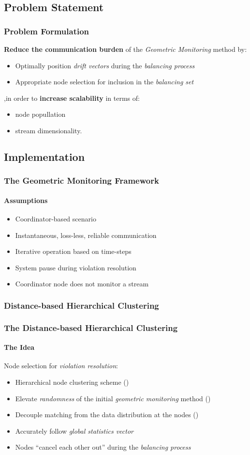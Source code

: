 \documentclass[hyperref={pdfpagelabels=false}]{beamer}
\begin{document}
\subsection{Problem Statement}
\begin{frame} \frametitle{Problem Formulation}
\textbf{Reduce the communication burden} of the \emph{Geometric Monitoring} method by:
\begin{itemize}
\item Optimally position \emph{drift vectors} during the \emph{balancing process}
\item Appropriate node selection for inclusion in the \emph{balancing set}
\end{itemize}
,in order to \textbf{increase scalability} in terms of:
\begin{itemize}
\item node popullation
\item stream dimensionality.
\end{itemize}
\end{frame}
\subsection{Implementation}

\begin{frame} \frametitle{The Geometric Monitoring Framework} \framesubtitle{Assumptions}
\begin{itemize}
\item Coordinator-based scenario
\item Instantaneous, loss-less, reliable communication
\item Iterative operation based on time-steps
\item System pause during violation resolution
\item Coordinator node does not monitor a stream
\end{itemize}
\end{frame}

\subsubsection*{Distance-based Hierarchical Clustering}
\begin{frame} \frametitle{The Distance-based Hierarchical Clustering}\framesubtitle{The Idea}
Node selection for \emph{violation resolution}:
\begin{itemize}
\item Hierarchical node clustering scheme {\tiny()}
\item Elevate \emph{randomness} of the initial \emph{geometric monitoring} method {\tiny()}
\item Decouple matching from the data distribution at the nodes {\tiny()}
\item Accurately follow \emph{global statistics vector}
\item Nodes ``cancel each other out'' during the \emph{balancing process}
\end{itemize}
\end{frame}
\end{document}
